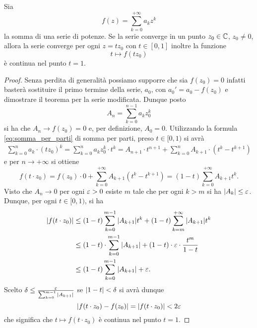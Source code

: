 \begin{theorem}
\mymark{*}%
\label{th:lemma_abel}%
%
%
Sia
\[
  f(z) = \sum_{k=0}^{+\infty} a_k z^k
\]
la somma di una serie di potenze. 
Se la serie converge in un punto $z_0\in {\mathbb C}$, $z_0\neq 0$, 
allora la serie converge per ogni $z=t z_0$ con $t\in [0,1]$ inoltre la funzione
\[
  t \mapsto f(tz_0)
\]
è continua nel punto $t=1$.
\end{theorem}
%
\begin{proof}
Senza perdita di generalità possiamo supporre che sia $f(z_0)=0$ infatti basterà sostituire il primo termine della serie, $a_0$, con $a_0' = a_0 - f(z_0)$ e dimostrare il teorema per la serie modificata.
Dunque posto
\[
  A_n = \sum_{k=0}^{n-1} a_k z_0^k
\]
si ha che $A_n \to f(z_0) = 0$ e, per definizione, $A_0 = 0$.
Utilizzando la formula \eqref{eq:somma_per_parti} di somma per parti, preso $t\in [0,1)$
si avrà
\begin{align*}
\sum_{k=0}^n a_k \cdot (tz_0)^k
= \sum_{k=0}^n a_k z_0^k \cdot t^k
= A_{n+1} \cdot t^{n+1} + \sum_{k=0}^n A_{k+1}\cdot (t^k - t^{k+1})
\end{align*}
e per $n\to +\infty$ si ottiene
\[
  f(t\cdot z_0) = f(z_0)\cdot 0 + \sum_{k=0}^{+\infty}A_{k+1}(t^k-t^{k+1})
  = (1-t)\sum_{k=0}^{+\infty} A_{k+1} t^k.
\]
Visto che $A_n \to 0$ per ogni $\varepsilon>0$ esiste $m$ tale che per ogni $k > m$ si ha ${\left|A_k\right|} \le  \varepsilon$. Dunque, per ogni $t\in [0,1)$, si ha
\begin{align*}
{\left|f(t\cdot z_0)\right|}
 &\le (1-t)\sum_{k=0}^{m-1} {\left|A_{k+1}\right|} t^k
  + (1-t)\sum_{k=m}^{+\infty} {\left|A_{k+1}\right|} t^k \\
 &\le (1-t)\cdot \sum_{k=0}^{m-1}{\left|A_{k+1}\right|} + (1-t)\cdot \varepsilon \cdot \frac{t^{m}}{1-t} \\
 &\le (1-t)\sum_{k=0}^{m-1}{\left|A_{k+1}\right|} + \varepsilon.
\end{align*}
Scelto $\delta \le \frac{\varepsilon} {\sum_{k=0}^{m-1} {\left|A_{k+1}\right|}}$ se ${\left|1-t\right|}<\delta$ si avrà
dunque
\[
  {\left|f(t\cdot z_0)-f(z_0)\right|} = {\left|f(t\cdot z_0)\right|} < 2\varepsilon
\]
che significa che $t\mapsto f(t\cdot z_0)$ è continua nel punto $t=1$.
\end{proof}
